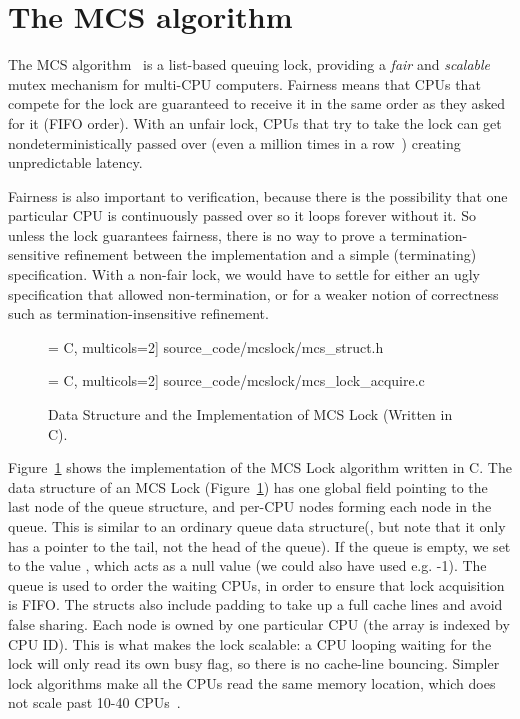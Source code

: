 \section{The MCS algorithm}
\label{chapter:mcslock:sec:overview}

The MCS algorithm~\cite{mcs91} is a list-based queuing lock,
providing a \emph{fair} and \emph{scalable} mutex mechanism for
multi-CPU computers. Fairness means that
CPUs that compete for the lock are guaranteed to receive it in the same
order as they asked for it (FIFO order). With an unfair lock, CPUs
that try to take the lock can get nondeterministically passed over
(even a million times in a row~\cite{lwn:ticketlocks}) creating
unpredictable latency.

Fairness is also important to verification, because
there is the possibility that one particular CPU is continuously
passed over so it loops forever without it.
So unless the lock
guarantees fairness, there is no way to prove a termination-sensitive
refinement between the implementation and a simple (terminating)
specification. With a non-fair lock, we would have to settle for
either an ugly specification that allowed non-termination, or for a
weaker notion of correctness such as termination-insensitive
refinement.
\begin{figure}
 = C, multicols=2] {source_code/mcslock/mcs_struct.h}

 = C, multicols=2] {source_code/mcslock/mcs_lock_acquire.c}
\caption{Data Structure and the Implementation of MCS Lock (Written in C).}
\label{fig:chapter:mcslock:mcs_lock}
\end{figure}

Figure~\ref{fig:chapter:mcslock:mcs_lock} shows the implementation of the MCS Lock algorithm written in C. 
The data structure of an MCS Lock (Figure~\ref{fig:chapter:mcslock:mcs_lock}) has
one global field pointing to the last node of the queue structure, and
per-CPU nodes forming each node in the queue. This is similar to an
ordinary queue data structure(, but note that it only has a
pointer to the tail, not the head of the queue).  If the queue is
empty, we set  to the value , which
acts as a null value (we could also have used e.g. -1). The queue is
used to order the waiting CPUs, in order to ensure that lock
acquisition is FIFO. The structs also include padding to take up a
full cache lines and avoid false sharing.  Each node is owned by one
particular CPU (the array is indexed by CPU ID).  This is what makes
the lock scalable: a CPU looping waiting for the lock will only read
its own busy flag, so there is no cache-line bouncing. Simpler lock
algorithms make all the CPUs read the same memory location, which does
not scale past 10-40 CPUs~\cite{Boyd-wickizer12}.

